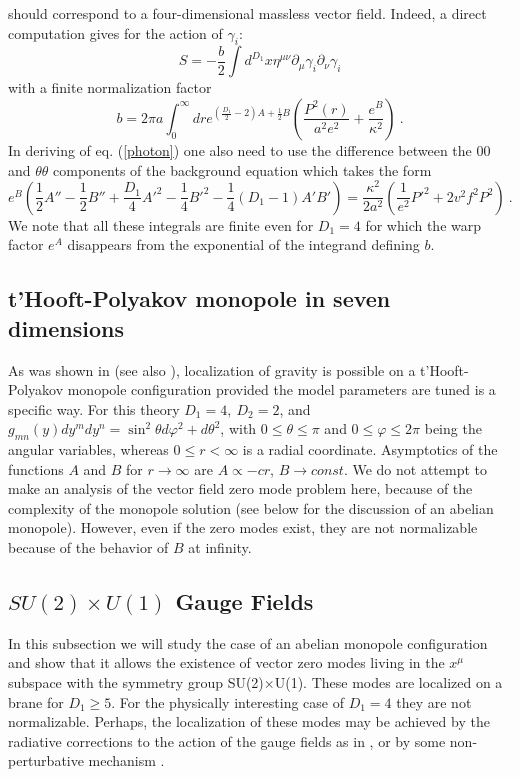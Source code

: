 \documentclass[a4paper,12pt]{article}
\begin{document}
should correspond to a four-dimensional massless vector field.
Indeed, a direct computation gives for the action of $\gamma_i$:
\begin{equation}
S= -\frac{b}{2}\int d^{D_1}x \eta^{\mu\nu}\partial_\mu\gamma_i\partial_\nu\gamma_i
\label{photon}
\end{equation} 
with a finite normalization factor
\begin{equation}
b=2\pi a\int_0^\infty dr e^{(\frac{D_1}{2}-2)A+\frac{1}{2}B} 
\left(\frac{P^2(r)}{a^2e^2}+ \frac{e^B}{\kappa^2}\right)~.
\end{equation}
In deriving of eq. (\ref{photon}) one also need to use
the difference between the  $00$ and $\theta\theta$ components of
the background equation which takes the form
\begin{equation}
 e^B\left( \frac{1}{2} A'' -\frac{1}{2} B'' +\frac{D_1}{4} {A'}^2-
\frac{1}{4}{B'}^2-\frac{1}{4}(D_1-1)A'B'\right)=
\frac{\kappa^2}{2a^2}(\frac{1}{e^2}{P'}^2+2v^2f^2P^2)~.
\end{equation}
We note that all these integrals are finite even for $D_1 = 4$ for
which the warp factor $e^A$ disappears from the exponential of the
integrand defining $b$.  

\subsection{t'Hooft-Polyakov monopole in seven dimensions}
As was shown in \cite{Gherghetta:2000jf} (see also \cite{ewald}),
localization of gravity is possible on a t'Hooft-Polyakov monopole
configuration provided the model parameters are tuned is a
specific way. For this theory $D_1=4,~D_2=2$, and $g_{mn}(y)dy^m
dy^n= \sin^2\theta d\varphi^2 + d\theta^2$, with
$0\leq\theta\leq\pi$ and $0\leq \varphi\leq 2\pi$ being the
angular variables, whereas $0\leq r <\infty$ is a radial
coordinate. Asymptotics of the functions $A$ and $B$ for $r \to
\infty$ are $A \propto -c r$, $B \to const$. We do not attempt to
make an analysis of the vector field zero mode problem here,
because of the complexity of the monopole solution (see below for
the discussion of an abelian monopole). However, even if the zero
modes exist, they are not normalizable because of the behavior of
$B$ at infinity.

\subsection {$SU(2)\times U(1)$ Gauge Fields}
In this subsection we will study the case of an abelian monopole
configuration and show that it allows the existence of vector zero
modes living in the $x^\mu$ subspace with the symmetry group
SU(2)$\times$U(1). These modes are localized on a brane for $D_1 \geq
5$. For the physically interesting case of $D_1=4$ they are not
normalizable. Perhaps, the localization of these modes may be
achieved by the radiative corrections to the action of the gauge
fields as in \cite{Dvali:2000rx}, or by some non-perturbative
mechanism \cite{Dvali:1996xe,Dubovsky:2001pe}.
\end{document}
